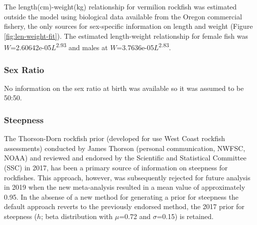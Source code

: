 \documentclass[11pt,
  english,
  a4paper,
]{article}
\begin{document}
\leavevmode\tagmcend\tagstructend


The length(cm)-weight(kg) relationship for vermilion rockfish was estimated outside the model using biological data available from the Oregon commercial fishery, the only sources for sex-specific information on length and weight (Figure \ref{fig:len-weight-fit}). The estimated length-weight relationship for female fish was {\(W\)\leavevmode\tagmcend\tagstructend}=2.60642e-05{\(L\)\leavevmode\tagmcend\tagstructend}\textsuperscript{2.93} and males at {\(W\)\leavevmode\tagmcend\tagstructend}=3.7636e-05{\(L\)\leavevmode\tagmcend\tagstructend}\textsuperscript{2.83}.

\leavevmode\tagmcend\tagstructend\par


\hypertarget{sex-ratio}{%
\subsubsection{Sex Ratio}\label{sex-ratio}}

\leavevmode\tagmcend\tagstructend


No information on the sex ratio at birth was available so it was assumed to be 50:50.

\leavevmode\tagmcend\tagstructend\par


\hypertarget{steepness}{%
\subsubsection{Steepness}\label{steepness}}

\leavevmode\tagmcend\tagstructend


The Thorson-Dorn rockfish prior (developed for use West Coast rockfish assessments) conducted by James Thorson (personal communication, NWFSC, NOAA) and reviewed and endorsed by the Scientific and Statistical Committee (SSC) in 2017, has been a primary source of information on steepness for rockfishes. This approach, however, was subsequently rejected for future analysis in 2019 when the new meta-analysis resulted in a mean value of approximately 0.95. In the absense of a new method for generating a prior for steepness the default approach reverts to the previously endorsed method, the 2017 prior for steepness ({\(h\)\leavevmode\tagmcend\tagstructend}; beta distribution with {\(\mu\)\leavevmode\tagmcend\tagstructend}=0.72 and {\(\sigma\)\leavevmode\tagmcend\tagstructend}=0.15) is retained.
\end{document}
